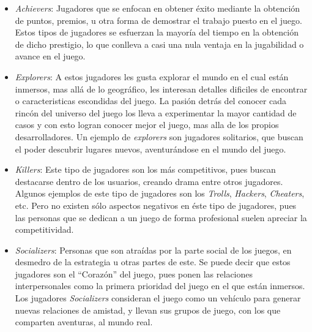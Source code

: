 \begin{itemize}
    \item \emph{Achievers}:
        Jugadores que se enfocan en obtener éxito mediante la obtención de puntos,
        premios, u otra forma de demostrar el trabajo puesto en el juego.
        Estos tipos de jugadores se esfuerzan la mayoría del tiempo en la obtención
        de dicho prestigio, lo que conlleva a casi una nula ventaja en la
        jugabilidad o avance en el juego.

    \item \emph{Explorers}:
        A estos jugadores les gusta explorar el mundo en el cual están inmersos,
        mas allá de lo geográfico, les interesan detalles dificiles de encontrar o
	caracteristicas escondidas del juego.
        La pasión detrás del conocer cada rincón del universo del juego los lleva 
        a experimentar la mayor cantidad de casos y con esto logran conocer mejor
        el juego, mas alla de los propios desarrolladores.
        Un ejemplo de \emph{explorers} son jugadores solitarios, que buscan el
        poder descubrir lugares nuevos, aventurándose en el mundo del juego.

    \item \emph{Killers}:
        Este tipo de jugadores son los más competitivos, pues buscan destacarse
        dentro de los usuarios, creando drama entre otros jugadores.
        Algunos ejemplos de este tipo de jugadores son los \emph{Trolls},
        \emph{Hackers}, \emph{Cheaters}, etc.
        Pero no existen sólo aspectos negativos en éste tipo de jugadores,
        pues las personas que se dedican a un juego de forma profesional
        suelen apreciar la competitividad.

    \item \emph{Socializers}:
        Personas que son atraídas por la parte social de los juegos,
        en desmedro de la estrategia u otras partes de este.
        Se puede decir que estos jugadores son el ``Corazón'' del juego,
        pues ponen las relaciones interpersonales como la primera prioridad
        del juego en el que están inmersos.
        Los jugadores \emph{Socializers} consideran el juego
        como un vehículo para generar nuevas relaciones de amistad, y llevan
        sus grupos de juego, con los que comparten aventuras, al mundo real.

\end{itemize}

